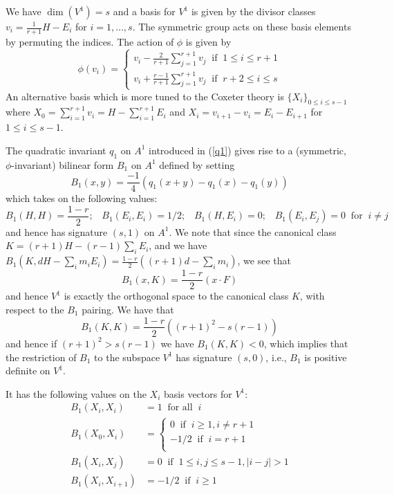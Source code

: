 \documentclass[12pt]{article}
\numberwithin{equation}{section}
\numberwithin{equation}{section}
\numberwithin{subeq}{equation}
\begin{document}
We have $\dim(V^1) = s$ and a basis for $V^1$ is given by the divisor classes
$v_i = \frac{1}{r+1}H-E_i$ for $i = 1,\ldots,s$.
The symmetric group acts on these basis elements by permuting the indices.
The action of $\phi$ is given by
\[
\phi(v_i) = \begin{cases}
v_i - \frac{2}{r+1}\sum_{j=1}^{r+1}v_j \;\;\text{if}\;\; 1 \leq i \leq r+1 \\
v_i + \frac{r-1}{r+1}\sum_{j=1}^{r+1}v_j \;\;\text{if}\;\; r+2 \leq i \leq s
\end{cases}
\]
An alternative basis which is more tuned to the Coxeter theory is
$\{X_i\}_{0\leq i \leq s-1}$
where $X_0 = \sum_{i=1}^{r+1} v_i = H - \sum_{i=1}^{r+1} E_i$
and $X_i = v_{i+1}-v_i = E_i - E_{i+1}$ for $1 \leq i \leq s-1$.

The quadratic invariant $q_1$ on $A^1$
introduced in (\ref{q1})
gives rise to a (symmetric, $\phi$-invariant) bilinear form $B_1$ on $A^1$
defined by setting
\[
B_1(x,y) = \frac{-1}{4}(q_1(x+y)-q_1(x)-q_1(y))
\]
which takes on the following values:
\[
B_1(H,H) = \frac{1-r}{2}; \;\;\;
B_1(E_i,E_i) = 1/2; \;\;\;
B_1(H,E_i) = 0; \;\;\;
B_1(E_i,E_j) = 0\;\;\text{for}\;\; i\neq j
\]
and hence has signature $(s,1)$ on $A^1$.
We note that
since the canonical class $K = (r+1)H-(r-1)\sum_i E_i$,
and we have
$B_1(K,dH-\sum_i m_iE_i) = \frac{1-r}{2}( (r+1)d-\sum_i m_i )$,
we see that
\[
B_1(x,K) = \frac{1-r}{2}(x\cdot F)
\]
and hence $V^1$ is exactly the orthogonal space to the canonical class $K$,
with respect to the $B_1$ pairing.
We have that
\[
B_1(K,K) = \frac{1-r}{2}( (r+1)^2 - s(r-1) )
\]
and hence if $(r+1)^2 > s(r-1)$ we have $B_1(K,K) < 0$,
which implies that the restriction of $B_1$ to the subspace $V^1$
has signature $(s,0)$, i.e., $B_1$ is positive definite on $V^1$.

It has the following values on the $X_i$ basis vectors for $V^1$:
\begin{align*}
B_1(X_i,X_i) &= 1 \;\;\text{for all}\;\; i \\
B_1(X_0,X_i) &= \begin{cases}
0 \;\;\text{if}\;\; i \geq 1, i \neq r+1 \\
-1/2 \;\;\text{if}\;\; i = r+1\\
\end{cases} \\
B_1(X_i,X_j) &= 0 \;\;\text{if}\;\; 1 \leq i, j \leq s-1, |i-j| > 1 \\
B_1(X_i,X_{i+1}) &= -1/2 \;\;\text{if}\;\; i \geq 1
\end{align*}
\end{document}
